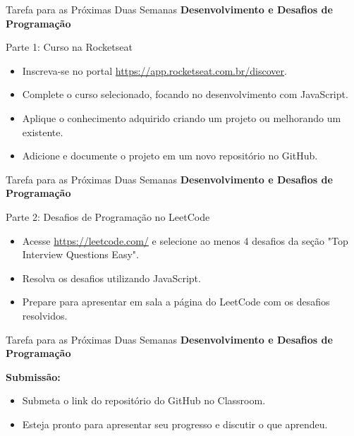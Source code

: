 \begin{frame}{Tarefa para as Próximas Duas Semanas}
  \textbf{Desenvolvimento e Desafios de Programação}
  
  \begin{block}{Parte 1: Curso na Rocketseat}
    \begin{itemize}
      \item Inscreva-se no portal \url{https://app.rocketseat.com.br/discover}.
      \item Complete o curso selecionado, focando no desenvolvimento com JavaScript.
      \item Aplique o conhecimento adquirido criando um projeto ou melhorando um existente.
      \item Adicione e documente o projeto em um novo repositório no GitHub.
    \end{itemize}
  \end{block}
  
\end{frame}

\begin{frame}{Tarefa para as Próximas Duas Semanas}
  \textbf{Desenvolvimento e Desafios de Programação}
  
  
  \begin{block}{Parte 2: Desafios de Programação no LeetCode}
    \begin{itemize}
      \item Acesse \url{https://leetcode.com/} e selecione ao menos 4 desafios da seção "Top Interview Questions Easy".
      \item Resolva os desafios utilizando JavaScript.
      \item Prepare para apresentar em sala a página do LeetCode com os desafios resolvidos.
    \end{itemize}
  \end{block}
  
\end{frame}

\begin{frame}{Tarefa para as Próximas Duas Semanas}
  \textbf{Desenvolvimento e Desafios de Programação}
  
  \textbf{Submissão:}
  \begin{itemize}
    \item Submeta o link do repositório do GitHub no Classroom.
    \item Esteja pronto para apresentar seu progresso e discutir o que aprendeu.
  \end{itemize}
\end{frame}